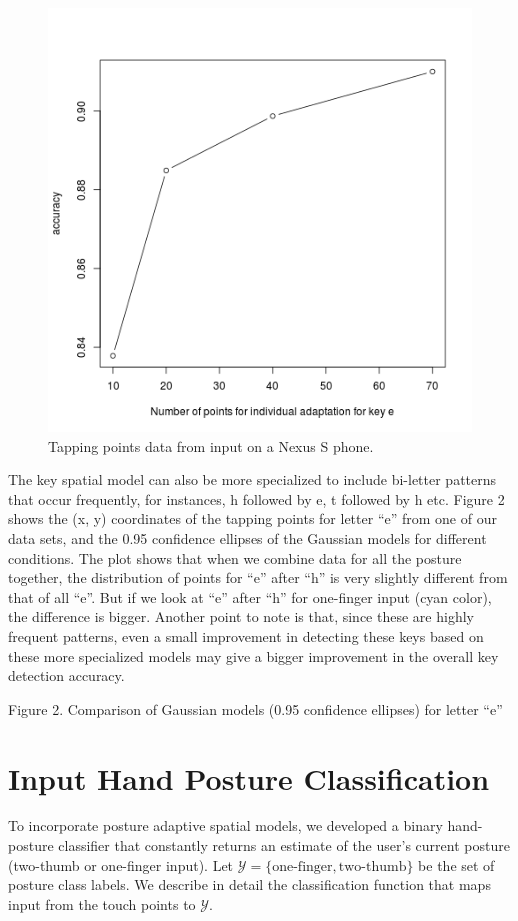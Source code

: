\documentclass{sigchi}
\begin{document}
\begin{figure}[tb]
  \centering
  \includegraphics[width=1\columnwidth]{figures/user-adapt-e.png}
  \caption{Tapping points data from input on a Nexus S phone.}
  \label{fig:user-adapt}
\end{figure}

The key spatial model can also be more specialized to include bi-letter patterns
that occur frequently, for instances, h followed by e, t followed by h etc. 
Figure 2 shows the (x, y) coordinates of the tapping points for letter “e” from 
one of our data sets, and the 0.95 confidence ellipses of the Gaussian models 
for different conditions. The plot shows that when we combine data for all the 
posture together, the distribution of points for “e” after “h” is very slightly 
different from that of all “e”. But if we look at “e” after “h” for one-finger input (cyan color), the difference is bigger. Another point to note is that, since these are highly frequent patterns, even a small improvement in detecting these keys based on these more specialized models may give a bigger improvement in the overall key detection accuracy.


Figure 2. Comparison of Gaussian models (0.95 confidence ellipses) for letter “e”

\section{Input Hand Posture Classification}\label{sec:posture-classification}
To incorporate posture adaptive spatial models, we developed a binary hand-posture classifier 
that constantly returns an estimate of the user's current posture (two-thumb or one-finger input).
Let $\mathcal{Y} = \{\text{one-finger}, \text{two-thumb}\}$ be the set of posture
class labels. We describe in detail the classification function that maps input from the
touch points to $\mathcal{Y}$.
\end{document}
